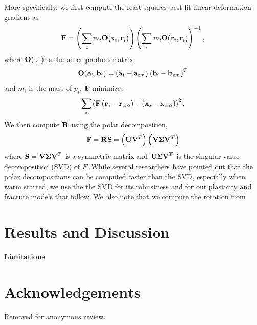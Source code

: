 \documentclass[review]{acmsiggraph}
\begin{document}
More specifically, we first compute the least-squares best-fit linear deformation gradient as
\begin{equation}
\mathit{\mathbf{F}} = \left(\sum_i m_i \mathit{\mathbf{O}}(\mathit{\mathbf{x}}_i,\mathit{\mathbf{r}}_i)\right)\left(\sum_im_i\mathit{\mathbf{O}}(\mathit{\mathbf{r}}_i,\mathit{\mathbf{r}}_i)\right)^{-1},
\end{equation}
where $\mathit{\mathbf{O}}(\cdot,\cdot)$ is the outer product matrix
\begin{equation}
\mathit{\mathbf{O}}(\mathit{\mathbf{a}}_i,\mathit{\mathbf{b}}_i) = \left(\mathit{\mathbf{a}}_i-\mathit{\mathbf{a}}_{cm}\right)\left(\mathit{\mathbf{b}}_{i}-\mathit{\mathbf{b}}_{cm}\right)^T
\end{equation}
and $m_i$ is the mass of $p_i$.  $\mathit{\mathbf{F}}$ minimizes
\begin{equation}
\sum_i \left(\mathit{\mathbf{F}}\left(\mathit{\mathbf{r}}_i - \mathit{\mathbf{r}}_{cm}\right)-\left(\mathit{\mathbf{x}}_i-\mathit{\mathbf{x}}_{cm}\right)\right)^2.
\end{equation}
We then compute $\mathit{\mathbf{R}}$ using the polar decomposition,
\begin{equation}
\mathit{\mathbf{F}} = \mathit{\mathbf{R}}\mathit{\mathbf{S}} = \left(\mathit{\mathbf{UV}}^T\right)\left(\mathit{\mathbf{V\Sigma V}}^T\right)
\end{equation}
where $\mathit{\mathbf{S}}=\mathit{\mathbf{V\Sigma V}}^T$ is a symmetric matrix and $\mathit{\mathbf{U\Sigma V}}^T$ is the singular value decomposition (SVD) of $F$.
While several researchers have pointed out that the polar decompositions can be computed faster than the SVD,
especially when warm started, we use the the SVD for its robustness and for our plasticity and fracture models
that follow.  We also note that we compute the rotation from 



\section{Results and Discussion}

\paragraph{Limitations}

\section*{Acknowledgements}
Removed for anonymous review.



\end{document}
